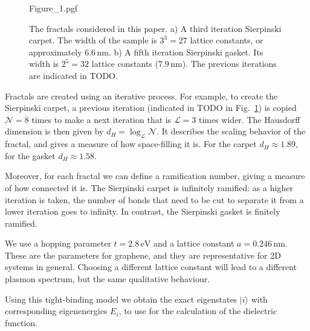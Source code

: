 \begin{figure}[h]
    \centering
    {Figure_1.pgf}
    \caption{
        The fractals considered in this paper.
        a) A third iteration Sierpinski carpet. The width of the sample is $3^3
        = 27$ lattice constants, or approximately $6.6\,\text{nm}$.
        b) A fifth iteration Sierpinski gasket. Its width is $2^5 = 32$
        lattice constants ($7.9\,\text{nm}$).
        The previous iterations are indicated in {\color{red}TODO}.
    }
    \label{fig:prb18:coordinates}
\end{figure}

Fractals are created using an iterative process. For example, to create the Sierpinski carpet, a previous iteration (indicated in {\color{red}TODO} in Fig.~\ref{fig:prb18:coordinates}) is copied $\mathcal{N} = 8$ times to make a next iteration that is $\mathcal{L} = 3$ times wider. The Hausdorff dimension is then given by $d_H=\log_\mathcal{L}\mathcal{N}$. It describes the scaling behavior of the fractal, and gives a measure of how space-filling it is. For the carpet $d_H \approx 1.89$, for the gasket $d_H \approx 1.58$.

Moreover, for each fractal we can define a ramification number, giving a measure of how connected it is. The Sierpinski carpet is infinitely ramified: as a higher iteration is taken, the number of bonds that need to be cut to separate it from a lower iteration goes to infinity. In contrast, the Sierpinski gasket is finitely ramified.

We use a hopping parameter $t=2.8\,\text{eV}$ and a lattice constant $a = 0.246\,\text{nm}$. These are the parameters for graphene, and they are representative for 2D systems in general. Choosing a different lattice constant will lead to a different plasmon spectrum, but the same qualitative behaviour.

Using this tight-binding model we obtain the exact eigenstates $|i\rangle$ with corresponding eigenenergies $E_i$, to use for the calculation of the dielectric function.

